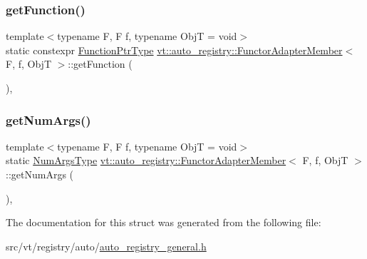 \subsubsection{\texorpdfstring{get\+Function()}{getFunction()}}
{\footnotesize\ttfamily template$<$typename F, F f, typename ObjT = void$>$ \\
static constexpr \hyperlink{structvt_1_1auto__registry_1_1_functor_adapter_member_a91cba3c1b53b4335861ba94ed69f212b}{Function\+Ptr\+Type} \hyperlink{structvt_1_1auto__registry_1_1_functor_adapter_member}{vt\+::auto\+\_\+registry\+::\+Functor\+Adapter\+Member}$<$ F, f, ObjT $>$\+::get\+Function (\begin{DoxyParamCaption}{ }\end{DoxyParamCaption})\hspace{0.3cm}{\ttfamily [inline]}, {\ttfamily [static]}}

\mbox{\label{structvt_1_1auto__registry_1_1_functor_adapter_member_adf03543e17aaaf788a9631a9c5979c6a}} 
\subsubsection{\texorpdfstring{get\+Num\+Args()}{getNumArgs()}}
{\footnotesize\ttfamily template$<$typename F, F f, typename ObjT = void$>$ \\
static \hyperlink{namespacevt_1_1auto__registry_aebda1d9d765bc9147dc654ad0712c936}{Num\+Args\+Type} \hyperlink{structvt_1_1auto__registry_1_1_functor_adapter_member}{vt\+::auto\+\_\+registry\+::\+Functor\+Adapter\+Member}$<$ F, f, ObjT $>$\+::get\+Num\+Args (\begin{DoxyParamCaption}{ }\end{DoxyParamCaption})\hspace{0.3cm}{\ttfamily [inline]}, {\ttfamily [static]}}



The documentation for this struct was generated from the following file\+:\begin{DoxyCompactItemize}
\item 
src/vt/registry/auto/\hyperlink{auto__registry__general_8h}{auto\+\_\+registry\+\_\+general.\+h}\end{DoxyCompactItemize}
